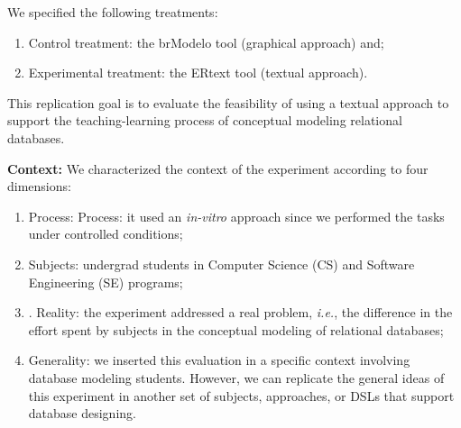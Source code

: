 We specified the following treatments:
\begin{enumerate} [label=\roman*.]
    \item Control treatment: the brModelo tool (graphical approach) and;
    \item Experimental treatment: the ERtext tool (textual approach).
\end{enumerate}
This replication goal is to evaluate the feasibility of using a textual approach to support the teaching-learning process of conceptual modeling relational databases.

\textbf{Context:}
We characterized the context of the experiment according to four dimensions:
\begin{enumerate}[label=\roman*.]
    \item Process: Process: it used an \textit{in-vitro} approach since we performed the tasks under controlled conditions;
    \item Subjects: undergrad students in Computer Science (CS) and Software Engineering (SE) programs;
    \item. Reality: the experiment addressed a real problem, \textit{i.e.}, the difference in the effort spent by subjects in the conceptual modeling of relational databases; 
    \item Generality: we inserted this evaluation in a specific context involving database modeling students.
    However, we can replicate the general ideas of this experiment in another set of subjects, approaches, or DSLs that support database designing. 
\end{enumerate}


